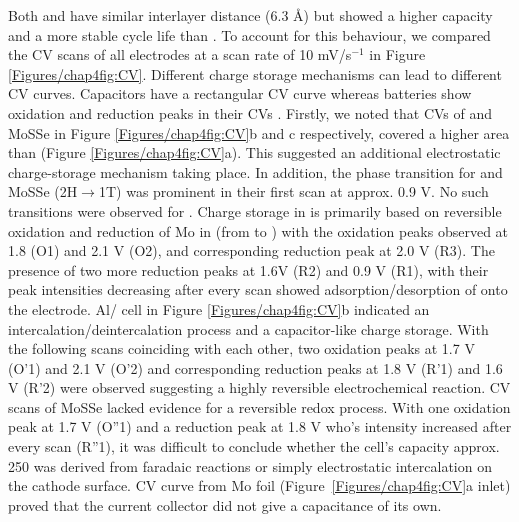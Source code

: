 Both  and  have similar interlayer distance (6.3 \AA) but  showed a higher capacity and a more stable cycle life than . To account for this behaviour, we compared the CV scans of all electrodes at a scan rate of 10 mV/s$^{-1}$ in Figure \ref{Figures/chap4fig:CV}. Different charge storage mechanisms can lead to different CV curves. Capacitors have a rectangular CV curve whereas batteries show oxidation and reduction peaks in their CVs \cite{jiao_aluminum-ion_2016}. Firstly, we noted that CVs of  and MoSSe in Figure \ref{Figures/chap4fig:CV}b and c respectively, covered a higher area than  (Figure \ref{Figures/chap4fig:CV}a). This suggested an additional electrostatic charge-storage mechanism taking place. In addition, the phase transition for  and MoSSe (2H$\rightarrow$1T) was prominent in their first scan at approx. 0.9 V. No such transitions were observed for . Charge storage in  is primarily based on reversible oxidation and reduction of Mo in  (from  to ) with the oxidation peaks observed at 1.8 (O1) and 2.1 V (O2), and corresponding reduction peak at 2.0 V (R3). The presence of two more reduction peaks at 1.6V (R2) and 0.9 V (R1), with their peak intensities decreasing after every scan showed adsorption/desorption of  onto the electrode. Al/ cell in Figure \ref{Figures/chap4fig:CV}b indicated an intercalation/deintercalation process and a capacitor-like charge storage. With the following scans coinciding with each other, two oxidation peaks at 1.7 V (O'1) and 2.1 V (O'2) and corresponding reduction peaks at 1.8 V (R'1) and 1.6 V (R'2) were observed suggesting a highly reversible electrochemical reaction. CV scans of MoSSe lacked evidence for a reversible redox process. With one oxidation peak at 1.7 V (O''1) and a reduction peak at 1.8 V who's intensity increased after every scan (R''1), it was difficult to conclude whether the cell's capacity approx. 250 was derived from faradaic reactions or simply electrostatic intercalation on the cathode surface. CV curve from Mo foil (Figure\ \ref{Figures/chap4fig:CV}a inlet) proved that the current collector did not give a capacitance of its own.

